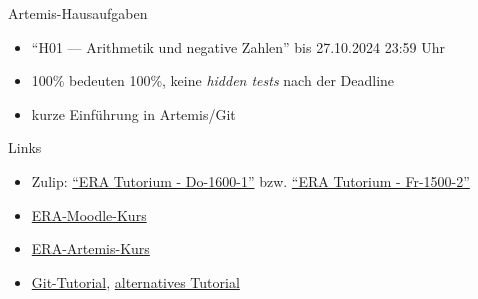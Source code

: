 \begin{frame}[c]{Artemis-Hausaufgaben}{}
	\begin{itemize}
		\item \enquote{H01 --- Arithmetik und negative Zahlen} bis 27.10.2024 23:59 Uhr
		\item 100\% bedeuten 100\%, keine \emph{hidden tests} nach der Deadline
		\item kurze Einführung in Artemis/Git
	\end{itemize}
\end{frame}

\begin{frame}[fragile, c]{Links}{}
	\begin{itemize}
		\item Zulip: \href{https://zulip.in.tum.de/#narrow/stream/2661-ERA-Tutorium---Do-1600-1}{\enquote{ERA Tutorium - Do-1600-1}}
		      bzw. \href{https://zulip.in.tum.de/#narrow/stream/2675-ERA-Tutorium---Fr-1500-2 }{\enquote{ERA Tutorium - Fr-1500-2}}
		\item \href{https://www.moodle.tum.de/course/view.php?id=100633}{ERA-Moodle-Kurs}
		\item \href{https://artemis.in.tum.de/courses/401}{ERA-Artemis-Kurs}
		\item \href{https://git-scm.com/docs/gittutorial}{Git-Tutorial}, \href{https://rogerdudler.github.io/git-guide/}{alternatives Tutorial}
	\end{itemize}
\end{frame}

\maketitle


